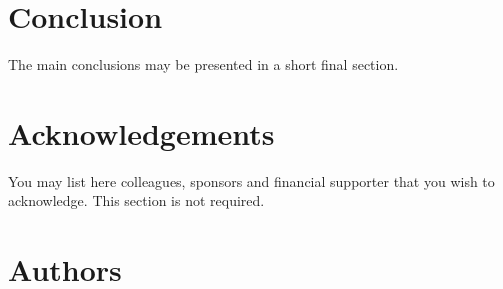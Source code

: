 \documentclass[10pt,a4paper,twocolumn]{article}
\begin{document}
\section{Conclusion}
\label{sec:conclusion}
The main conclusions may be presented in a short final section.


\section*{Acknowledgements}
\label{sec:ackn}
You may list here colleagues, sponsors and financial supporter that you wish to acknowledge.
This section is not required.


\printbibliography


\section*{Authors}
\label{sec:auth}
\end{document}
